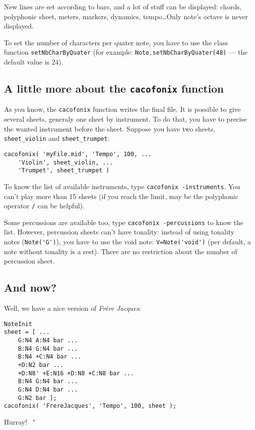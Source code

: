 \documentclass{article}
\newcommand\frerejaques{\emph{Fr\`ere Jacques}\xspace}
\newenvironment{meenv}{ \par \noindent \makebox[6em][r]{ \textcolor{mecolor}{Me}: " --~}}{~"}
\newcommand{ \me }[1]{%
\begin{meenv}%
	#1%
\end{meenv} }
\begin{document}
New lines are set according to bars, and a lot of stuff can be displayed: chords, polyphonic sheet, meters, markers, dynamics, tempo\dots Only note's octave is never displayed.

To set the number of characters per quater note, you have to use the class function \lstinline!setNbCharByQuater! (for example: \lstinline!Note.setNbCharByQuater(48)! --- the default value is 24).

\subsection{A little more about the \lstinline!cacofonix! function}

As you know, the \lstinline!cacofonix! function writes the final file. It is possible to give several sheets, generaly one sheet by instrument. To do that, you have to precise the wanted instrument before the sheet. Suppose you have two sheets, \lstinline!sheet_violin! and \lstinline!sheet_trumpet!:
\begin{lstlisting}
cacofonix( 'myFile.mid', 'Tempo', 100, ...
	'Violin', sheet_violin, ...
	'Trumpet', sheet_trumpet )
\end{lstlisting}

To know the list of available instruments, type \lstinline!cacofonix -instruments!. You can't play more than 15 sheets (if you reach the limit, may be the polyphonic operator \lstinline!/! can be helpful).

Some percussions are available too, type \lstinline!cacofonix -percussions! to know the list. However, percussion sheets can't have tonality: instead of using tonality notes (\lstinline!Note('G')!), you have to use the void note: \lstinline!V=Note('void')! (per default, a note without tonality is a rest). There are no restriction about the number of percussion sheet.

\subsection{And now?}

Well, we have a nice version of \frerejaques:
\begin{lstlisting}
NoteInit
sheet = [ ...
	G:N4 A:N4 bar ...
	B:N4 G:N4 bar ...
	B:N4 +C:N4 bar ...
	+D:N2 bar ...
	+D:N8' +E:N16 +D:N8 +C:N8 bar ...
	B:N4 G:N4 bar ...
	G:N4 D:N4 bar ...
	G:N2 bar ];
cacofonix( 'FrereJacques', 'Tempo', 100, sheet );
\end{lstlisting}

\me{Hurray!}
\end{document}
